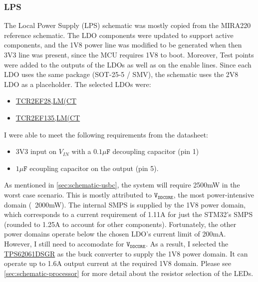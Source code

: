 \documentclass[10pt]{article}
\newcommand{\nl}{\newline \newline}
\begin{document}
\subsubsection{LPS}\label{sec:schematic-ldos}
The Local Power Supply (LPS) schematic was mostly copied from the MIRA220 reference schematic. The LDO components were updated to support active components, and the 1V8 power line was modified to be generated when then 3V3 line was present, since the MCU requires 1V8 to boot.
Moreover, 
Test points were added to the outputs of the LDOs as well as on the enable lines. Since each LDO uses the same package (SOT-25-5 / SMV), the schematic uses the 2V8 LDO as a placeholder.
The selected LDOs were:
\begin{itemize}
    \item \href{https://au.mouser.com/ProductDetail/Toshiba/TCR2EF28LMCT?qs=cW4DzVrAanOy43sfBSrpyQ%3D%3D}{TCR2EF28,LM(CT}
    \item \href{https://au.mouser.com/ProductDetail/Toshiba/TCR2EF135LMCT?qs=bZr6mbWTK5l0uINCghoB7g%3D%3D}{TCR2EF135,LM(CT}
\end{itemize}
I were able to meet the following requirements from the datasheet:
\begin{itemize}
    \item 3V3 input on $V_{IN}$ with a $0.1\mu\texttt{F}$ decoupling capacitor (pin 1)
    \item $1\mu\texttt{F}$ ecoupling capacitor on the output (pin 5).
\end{itemize}
As mentioned in \autoref{sec:schematic-usbc}, the system will require 2500mW in the worst case scenario. This is mostly attributed to $\texttt{V}_{\texttt{DDCORE}}$, the most power-intensive domain (~2000mW). The internal SMPS is supplied by the 1V8 power domain, which corresponds to a current requirement of 1.11A for just the STM32's SMPS (rounded to 1.25A to account for other components).
Fortunately, the other power domains operate below the chosen LDO's current limit of 200mA. However, I still need to accomodate for $\texttt{V}_{\texttt{DDCORE}}$.
As a result, I selected the \href{https://au.mouser.com/ProductDetail/Texas-Instruments/TPS62061DSGR?qs=sGAEpiMZZMvAX9OfPh%252B2NTd%2Fl77i5i6T9vQ1%2FEkgUpA%3D}{TPS62061DSGR} as the buck converter to supply the 1V8 power domain. It can operate up to 1.6A output current at the required 1V8 domain.
\nl
Please see \autoref{sec:schematic-processor} for more detail about the resistor selection of the LEDs.

\end{document}
